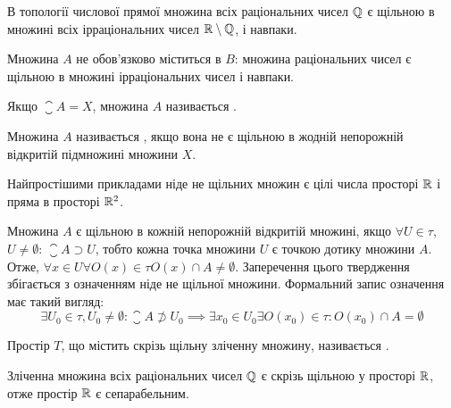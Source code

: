 \begin{example}
В топології числової прямої множина всіх
раціональних чисел $\mathbb{Q}$ є щільною в множині всіх
ірраціональних чисел $\mathbb{R} \setminus \mathbb{Q}$, і навпаки.
\end{example}

\begin{remark}
Множина $A$ не обов’язково міститься в
$B$: множина раціональних чисел є щільною в множині
ірраціональних чисел і навпаки.
\end{remark}

\begin{definition}
Якщо $\closure A = X$, множина $A$ називається .
\end{definition}

\begin{definition}
Множина $A$ називається ,
якщо вона не є щільною в жодній непорожній відкритій
підмножині множини $X$.
\end{definition}

\begin{example}
Найпростішими прикладами ніде не
щільних множин є цілі числа просторі $\mathbb{R}$ і пряма в просторі
$\mathbb{R}^2$.
\end{example}

Множина $A$ є щільною в кожній непорожній відкритій
множині, якщо $\forall U \in \tau$, $U \ne \emptyset$: $\closure A \supset U$,
тобто кожна точка множини $U$ є точкою дотику множини $A$. Отже,
$\forall x \in U \forall O(x) \in \tau O(x) \cap A \ne \emptyset$. Заперечення цього
твердження збігається з означенням ніде не щільної
множини. Формальний запис означення має такий вигляд:
\begin{equation*}
\exists U_0 \in \tau, U_0 \ne \emptyset: \closure A \not\supset U_0 \implies \exists x_0 \in U_0 \exists O(x_0) \in \tau: O(x_0) \cap A = \emptyset
\end{equation*}

\begin{definition}
Простір $T$, що містить скрізь щільну зліченну
множину, називається .
\end{definition}

\begin{example}
Зліченна множина всіх раціональних чисел
$\mathbb{Q}$ є скрізь щільною у просторі $\mathbb{R}$, отже простір $\mathbb{R}$ є
сепарабельним.
\end{example}

